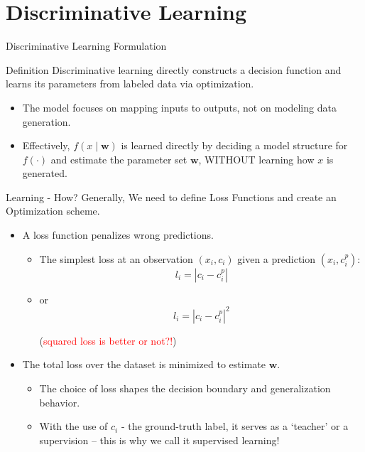 \documentclass[10pt]{beamer}
\begin{document}
\section{Discriminative Learning}

\begin{frame}{Discriminative Learning Formulation}
    \justifying
    \begin{conceptbox}{Definition}
        Discriminative learning directly constructs a decision function and learns its parameters
        from labeled data via optimization.
    \end{conceptbox}
    \begin{itemize}
        \item The model focuses on mapping inputs to outputs, not on modeling data generation.
        \item Effectively, $f(x \mid \bm{w})$ is learned directly by deciding a model structure for $f(\cdot)$ and estimate the parameter set $\bm{w}$, WITHOUT learning how $x$ is generated. 
    \end{itemize}
\end{frame}

\begin{frame}{Learning - How? Generally, }
    \justifying
    We need to define Loss Functions and create an Optimization scheme.
    \begin{itemize}
        \item A loss function penalizes wrong predictions.
\begin{itemize}
    \item The simplest loss at an observation $(x_i, c_i)$ given a prediction $(x_i, c_i^p)$:
    \[
        l_i = | c_i - c_i^p|
        \]
        \item or 
          \[
        l_i = | c_i - c_i^p|^2
        \]

        (\textcolor{red}{squared loss is better or not?!})
   
\end{itemize}

        \item The total loss over the dataset is minimized to estimate $\bm{w}$.
        \begin{itemize}
            \item The choice of loss shapes the decision boundary and generalization behavior.
            \item  With the use of $c_i$ - the ground-truth label, it serves as a `teacher' or a supervision -- this is why we call it supervised learning!
        \end{itemize}
    \end{itemize}
\end{frame}
\end{document}
